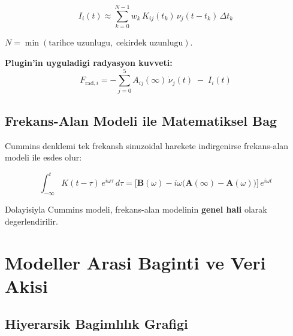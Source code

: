 \documentclass[12pt,a4paper]{article}
\newcommand{\Avec}{\mathbf{A}}
\newcommand{\Bvec}{\mathbf{B}}
\newcommand{\Ainf}{\mathbf{A}(\infty)}
\begin{document}
\begin{equation}
  I_i(t)
    \approx \sum_{k=0}^{N-1} w_k\,K_{ij}(t_k)\,\nu_j(t-t_k)\,\Delta t_k
  \label{eq:convolution}
\end{equation}

$N = \min(\text{tarihce uzunlugu},\;\text{cekirdek uzunlugu})$.

\textbf{Plugin'in uyguladigi radyasyon kuvveti:}
\begin{equation}
  \boxed{
  F_{\text{rad},i}
    = -\sum_{j=0}^{5} A_{ij}(\infty)\,\dot{\nu}_j(t)
    \;-\; I_i(t)
  }
  \label{eq:rad_force}
\end{equation}

\subsection{Frekans-Alan Modeli ile Matematiksel Bag}

Cummins denklemi tek frekansh sinuzoidal harekete indirgenirse
frekans-alan modeli ile esdes olur:

\begin{equation}
  \int_{-\infty}^{t} K(t-\tau)\,e^{i\omega\tau}\,d\tau
    = \bigl[\Bvec(\omega)
       - i\omega\bigl(\Ainf - \Avec(\omega)\bigr)\bigr]\,e^{i\omega t}
  \label{eq:cummins_freq_equiv}
\end{equation}

Dolayisiyla Cummins modeli, frekans-alan modelinin \textbf{genel hali}
olarak degerlendirilir.

\newpage
\section{Modeller Arasi Baginti ve Veri Akisi}

\subsection{Hiyerarsik Bagimlılık Grafigi}
\end{document}
